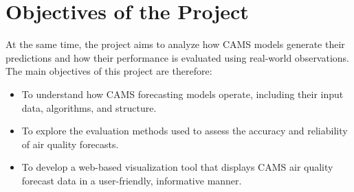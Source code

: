 \section{Objectives of the Project}

At the same time, the project aims to analyze how CAMS models generate their predictions and how their performance is evaluated using real-world observations.
The main objectives of this project are therefore:

\begin{itemize}
	\item To understand how CAMS forecasting models operate, including their input data, algorithms, and structure.
	\item To explore the evaluation methods used to assess the accuracy and reliability of air quality forecasts.
	\item To develop a web-based visualization tool that displays CAMS air quality forecast data in a user-friendly, informative manner.
\end{itemize}
